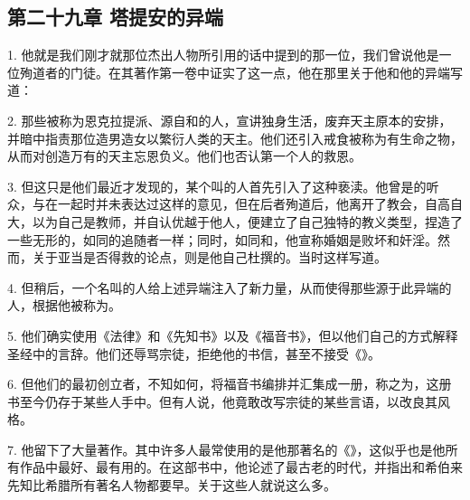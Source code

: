 
\subsection{第二十九章  塔提安的异端}

1. 他就是我们刚才就那位杰出人物所引用的话中提到的那一位，我们曾说他是一位殉道者的门徒。在其著作第一卷中证实了这一点，他在那里关于他和他的异端写道：\par

2. 那些被称为恩克拉提派、源自和的人，宣讲独身生活，废弃天主原本的安排，并暗中指责那位造男造女以繁衍人类的天主。他们还引入戒食被称为有生命之物，从而对创造万有的天主忘恩负义。他们也否认第一个人的救恩。\par

3. 但这只是他们最近才发现的，某个叫的人首先引入了这种亵渎。他曾是的听众，与在一起时并未表达过这样的意见，但在后者殉道后，他离开了教会，自高自大，以为自己是教师，并自认优越于他人，便建立了自己独特的教义类型，捏造了一些无形的，如同的追随者一样；同时，如同和，他宣称婚姻是败坏和奸淫。然而，关于亚当是否得救的论点，则是他自己杜撰的。当时这样写道。\par

4. 但稍后，一个名叫的人给上述异端注入了新力量，从而使得那些源于此异端的人，根据他被称为。\par

5. 他们确实使用《法律》和《先知书》以及《福音书》，但以他们自己的方式解释圣经中的言辞。他们还辱骂宗徒，拒绝他的书信，甚至不接受《》。\par

6. 但他们的最初创立者，不知如何，将福音书编排并汇集成一册，称之为，这册书至今仍存于某些人手中。但有人说，他竟敢改写宗徒的某些言语，以改良其风格。\par

7. 他留下了大量著作。其中许多人最常使用的是他那著名的《》，这似乎也是他所有作品中最好、最有用的。在这部书中，他论述了最古老的时代，并指出和希伯来先知比希腊所有著名人物都要早。关于这些人就说这么多。\par

